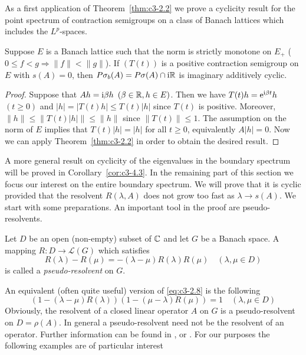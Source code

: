 As a first application of Theorem~\ref{thm:c3-2.2} we prove a cyclicity result for the point spectrum of contraction semigroups on a class of Banach lattices which includes the $L^p$-spaces.

\begin{corollary}\label{cor:c3-2.3}
	Suppose $E$ is a Banach lattice such that the norm is strictly monotone on $E_{+}$ (\ie  $0 \leq f < g \Rightarrow \|f\| < \|g\|$).
	If $(T(t))$ is a positive contraction semigroup on $E$ with $s(A) = 0$, then $P\sigma_{b}(A) = P\sigma(A) \cap \mathrm{i}\mathbb{R} $ is imaginary additively cyclic.
\end{corollary}
\begin{proof}
	Suppose that $Ah = \mathrm{i}\beta  h$ $(\beta \in \mathbb{R} , h \in E)$.
	Then we have $T(t)h = \mathrm{e}^{\mathrm{i}\beta  t}h$ $(t \geq 0)$ and $|h| = |T(t)h| \leq T(t)|h|$ since $T(t)$ is positive.
	Moreover, $\|h\| \leq \|T(t)|h|\| \leq \|h\|$ since $\|T(t)\| \leq 1$.
	The assumption on the norm of $E$ implies that $T(t)|h| = |h|$ for all $t \geq 0$, equivalently $A|h| = 0$.
	Now we can apply Theorem~\ref{thm:c3-2.2} in order to obtain the desired result.
\end{proof}
A more general result on cyclicity of the eigenvalues in the boundary spectrum will be proved in Corollary~\ref{cor:c3-4.3}.
In the remaining part of this section we focus our interest on the entire boundary spectrum.
We will prove that it is cyclic provided that the resolvent $R(\lambda,A)$ does not grow too fast as $\lambda \to s(A)$.
We start with some preparations.
An important tool in the proof are pseudo-resolvents.
\begin{definition}\label{def:c3-2.4}
	Let $D$ be an open (non-empty) subset of $\mathbb{C} $ and let $G$ be a Banach space.
	A mapping $R \colon D \to \mathcal{L}(G)$ which satisfies
	\begin{equation}\label{eq:c3-2.8}
		R(\lambda) - R(\mu) = -(\lambda - \mu)R(\lambda)R(\mu) \quad (\lambda,\mu \in D)
	\end{equation}
	is called a \emph{pseudo-resolvent} on $G$.
\end{definition}
An equivalent (often quite useful) version of \eqref{eq:c3-2.8} is the following
\begin{equation}\label{eq:c3-2.9}
	(1 - (\lambda - \mu)R(\lambda))(1 - (\mu - \lambda)R(\mu)) = 1 \quad (\lambda,\mu \in D)
\end{equation}
Obviously, the resolvent of a closed linear operator $A$ on $G$ is a pseudo-resolvent on $D = \rho(A)$.
In general a pseudo-resolvent need not be the resolvent of an operator.
Further information can be found in \citet{hillephillips:1957}, \citet{pazy:1983} or \citet{yosida:1965}.
For our purposes the following examples are of particular interest

